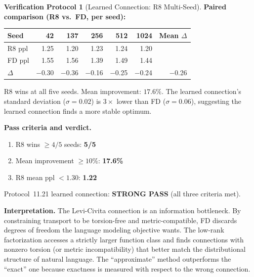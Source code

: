 \documentclass[11pt,a4paper]{article}
\theoremstyle{definition}
\newtheorem{protocol}[theorem]{Verification Protocol}
\theoremstyle{remark}
\begin{document}
\begin{protocol}[Learned Connection: R8 Multi-Seed]
\textbf{Paired comparison (R8 vs.\ FD, per seed):}
\begin{center}
\begin{tabular}{lrrrrr|r}
\toprule
Seed & 42 & 137 & 256 & 512 & 1024 & Mean $\Delta$ \\
\midrule
R8 ppl   & 1.25 & 1.20 & 1.23 & 1.24 & 1.20 & \\
FD ppl   & 1.55 & 1.56 & 1.39 & 1.49 & 1.44 & \\
$\Delta$ & $-$0.30 & $-$0.36 & $-$0.16 & $-$0.25 & $-$0.24 & 
  $-$0.26 \\
\bottomrule
\end{tabular}
\end{center}
R8 wins at all five seeds. Mean improvement: $17.6\%$. The learned 
connection's standard deviation ($\sigma = 0.02$) is $3\times$ lower than 
FD ($\sigma = 0.06$), suggesting the learned connection finds a 
more stable optimum.

\medskip
\textbf{Pass criteria and verdict.}
\begin{enumerate}[nosep]
  \item R8 wins $\geq 4/5$ seeds: \textbf{5/5}~\checkmark
  \item Mean improvement $\geq 10\%$: \textbf{17.6\%}~\checkmark
  \item R8 mean ppl $< 1.30$: \textbf{1.22}~\checkmark
\end{enumerate}
Protocol~11.21 learned connection: \textbf{STRONG PASS} (all three 
criteria met).

\medskip
\textbf{Interpretation.} The Levi-Civita connection is an information 
bottleneck. By constraining transport to be torsion-free and 
metric-compatible, FD discards degrees of freedom the language 
modeling objective wants. The low-rank factorization accesses a 
strictly larger function class and finds connections with nonzero 
torsion (or metric incompatibility) that better match the 
distributional structure of natural language. The ``approximate'' 
method outperforms the ``exact'' one because exactness is measured 
with respect to the wrong connection.
\end{protocol}
\end{document}
